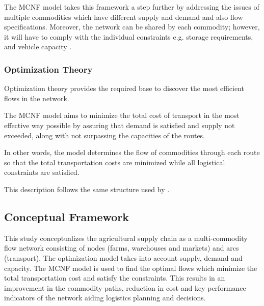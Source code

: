 \documentclass{icsthesis}
\begin{document}
\begin{mainmatter}
The MCNF model takes this framework a step further by addressing the issues of multiple commodities which have different supply and demand and also flow specifications. Moreover, the network can be shared by each commodity; however, it will have to comply with the individual constraints e.g. storage requirements, and vehicle capacity \citep{rodrigo2018}.


\subsubsection{Optimization Theory}
Optimization theory provides the required base to discover the most efficient flows in the network.

The MCNF model aims to minimize the total cost of transport in the most effective way possible by assuring that demand is satisfied and supply not exceeded, along with not surpassing the capacities of the routes.

In other words, the model determines the flow of commodities through each route so that the total transportation costs are minimized while all logistical constraints are satisfied.

This description follows the same structure used by \citet{rodrigo2018}.


\subsection{Conceptual Framework}

This study conceptualizes the agricultural supply chain as a multi-commodity flow network consisting of nodes (farms, warehouses and markets) and arcs (transport). The optimization model takes into account supply, demand and capacity. The MCNF model is used to find the optimal flows which minimize the total transportation cost and satisfy the constraints. This results in an improvement in the commodity paths, reduction in cost and key performance indicators of the network aiding logistics planning and decisions.

\usetikzlibrary{shapes.geometric, arrows}

\begin{figure}[htbp]
\centering
{}
\end{figure}
\end{mainmatter}
\end{document}
